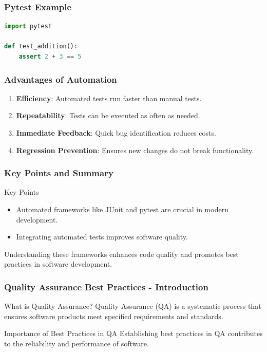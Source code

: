 \documentclass{beamer}
\begin{document}
\begin{frame}[fragile]
    \frametitle{Pytest Example}
    \begin{lstlisting}[language=Python]
import pytest

def test_addition():
    assert 2 + 3 == 5
    \end{lstlisting}
\end{frame}

\begin{frame}
    \frametitle{Advantages of Automation}
    \begin{enumerate}
        \item \textbf{Efficiency}: Automated tests run faster than manual tests.
        \item \textbf{Repeatability}: Tests can be executed as often as needed.
        \item \textbf{Immediate Feedback}: Quick bug identification reduces costs.
        \item \textbf{Regression Prevention}: Ensures new changes do not break functionality.
    \end{enumerate}
\end{frame}

\begin{frame}
    \frametitle{Key Points and Summary}
    \begin{block}{Key Points}
        \begin{itemize}
            \item Automated frameworks like JUnit and pytest are crucial in modern development.
            \item Integrating automated tests improves software quality.
        \end{itemize}
    \end{block}
    Understanding these frameworks enhances code quality and promotes best practices in software development.
\end{frame}

\begin{frame}[fragile]
    \frametitle{Quality Assurance Best Practices - Introduction}
    \begin{block}{What is Quality Assurance?}
        Quality Assurance (QA) is a systematic process that ensures software products meet specified requirements and standards. 
    \end{block}
    \begin{block}{Importance of Best Practices in QA}
        Establishing best practices in QA contributes to the reliability and performance of software.
    \end{block}
\end{frame}
\end{document}
